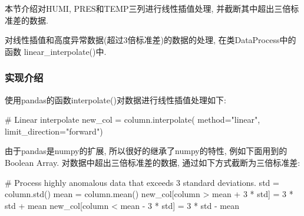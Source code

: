 本节介绍对HUMI, PRES和TEMP三列进行线性插值处理, 并截断其中超出三倍标准差的数据.\par

对线性插值和高度异常数据(超过3倍标准差)的数据的处理, 在类DataProcess中的函数
linear\_interpolate()中.\par

\subsubsection{实现介绍}
使用pandas的函数interpolate()对数据进行线性插值处理如下:
\begin{python}
    # Linear interpolate
    new_col = column.interpolate(
        method="linear", limit_direction="forward")
\end{python}

由于pandas是numpy的扩展, 所以很好的继承了numpy的特性, 例如下面用到的Boolean
Array.
对数据中超出三倍标准差的数据, 通过如下方式截断为三倍标准差:
\begin{python}
    # Process highly anomalous data that exceeds 3 standard deviations.
    std = column.std()
    mean = column.mean()
    new_col[column > mean + 3 * std] = 3 * std + mean
    new_col[column < mean - 3 * std] = 3 * std - mean
\end{python}

